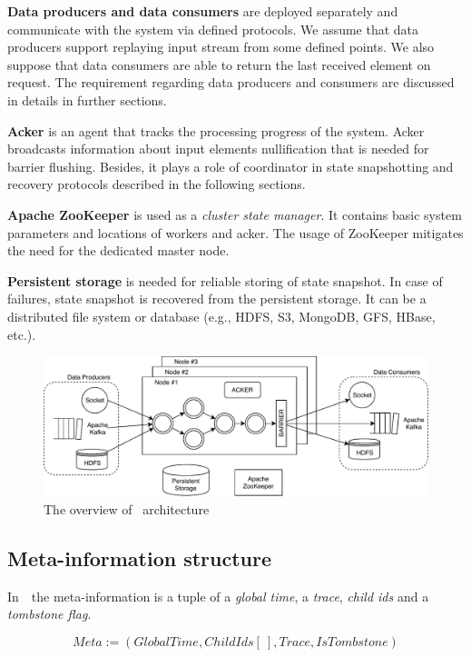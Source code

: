 {\bf Data producers and data consumers} are deployed separately and communicate with the system via defined protocols. We assume that data producers support replaying input stream from some defined points. We also suppose that data consumers are able to return the last received element on request. The requirement regarding data producers and consumers are discussed in details in further sections.

{\bf Acker} is an agent that tracks the processing progress of the system. Acker broadcasts information about input elements nullification that is needed for barrier flushing. Besides, it plays a role of coordinator in state snapshotting and recovery protocols described in the following sections.

{\bf Apache ZooKeeper} is used as a {\it cluster state manager}. It contains basic system parameters and locations of workers and acker. The usage of ZooKeeper mitigates the need for the dedicated master node.

{\bf Persistent storage} is needed for reliable storing of state snapshot. In case of failures, state snapshot is recovered from the persistent storage. It can be a distributed file system or database (e.g., HDFS, S3, MongoDB, GFS, HBase, etc.).

\begin{figure}[htbp]
  \centering
  \includegraphics[scale=0.78]{pics/arch}
  \caption{The overview of \FlameStream\ architecture}
  \label {arch}
\end{figure}

\subsection{Meta-information structure}

In~\FlameStream\ the meta-information is a tuple of a {\it global time}, a {\it trace}, {\it child ids} and a {\it tombstone flag}.

\[Meta := (GlobalTime, ChildIds[\:], Trace, IsTombstone)\]

